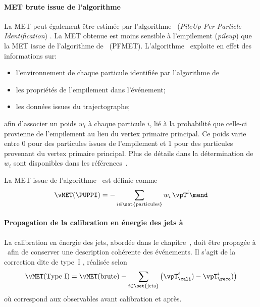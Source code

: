 \paragraph{MET brute issue de l'algorithme \PUPPI}
La MET peut également être estimée par l'algorithme \PUPPI\ (\emph{PileUp Per Particle Identification}) \cite{PUPPI}.
La \og \PUPPI MET \fg{} obtenue est moins sensible à l'empilement (\emph{pileup}) que la MET issue de l'algorithme de \PF\ (PFMET).
L'algorithme \PUPPI\ exploite en effet des informations sur:
\begin{itemize}
\item l'environnement de chaque particule identifiée par l'algorithme de \PF\;
\item les propriétés de l'empilement dans l'événement;
\item les données issues du trajectographe;
\end{itemize}
afin d'associer un poids $w_i$ à chaque particule $i$, lié à la probabilité que celle-ci provienne de l'empilement au lieu du vertex primaire principal.
Ce poids varie entre
\num{0} pour des particules issues de l'empilement
et
\num{1} pour des particules provenant du vertex primaire principal.
Plus de détails dans la détermination de $w_i$ sont disponibles dans les références~\cite{CMS-PAS-JME-17-001,PUPPI}.
\par La MET issue de l'algorithme \PUPPI\ est définie comme
\begin{equation}
\vMET(\text{\PUPPI}) = -\sum_{i\in\set{\text{particules}}} w_i\,\vpT^{i}
\mend
\end{equation}
\paragraph{Propagation de la calibration en énergie des jets à \MET}
La calibration en énergie des jets, abordée dans le chapitre~, doit être propagée à \MET\ afin de conserver une description cohérente des événements.
Il s'agit de la correction dite de \og type~I \fg{} \cite{CMS_WorkBookMetAnalysis},
réalisée selon
\begin{equation}
\vMET(\text{Type~I}) = \vMET(\text{brute}) - \sum_{i\in\set{\text{jets}}} \left( \vpT^i_\cali) - \vpT^i_\reco) \right)
\end{equation}
où
\og \reco \fg{} correspond aux observables avant calibration
et
\og \cali \fg{} après.